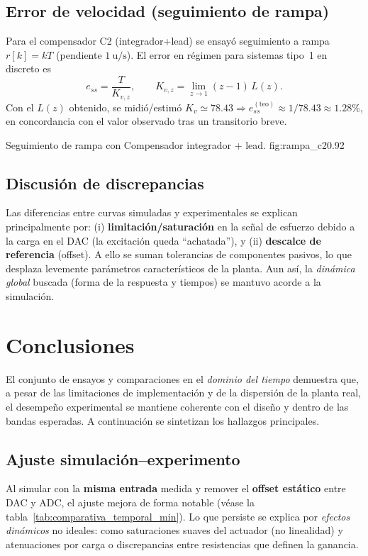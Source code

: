 \subsection{Error de velocidad (seguimiento de rampa)}
Para el compensador C2 (integrador+lead) se ensayó seguimiento a rampa \(r[k]=kT\) (pendiente \(1\ \mathrm{u}/\mathrm{s}\)). El error en régimen para sistemas tipo~1 en discreto es
\begin{equation}
	\label{eq:ess_rampa_discreto}
	e_{ss}=\frac{T}{K_{v,z}},\qquad K_{v,z}=\lim_{z\to1}(z-1)\,L(z).
\end{equation}
Con el \(L(z)\) obtenido, se midió/estimó \(K_v\simeq 78.43\Rightarrow e_{ss}^{(\mathrm{teo})}\approx 1/78.43\approx 1.28\%\), en concordancia con el valor observado tras un transitorio breve.

{Seguimiento de rampa con Compensador integrador + lead.}
{fig:rampa_c2}{0.92}

\subsection{Discusión de discrepancias}
Las diferencias entre curvas simuladas y experimentales se explican principalmente por: (i) \textbf{limitación/saturación} en la señal de esfuerzo debido a la carga en el DAC (la excitación queda “achatada”), y (ii) \textbf{descalce de referencia} (offset). A ello se suman tolerancias de componentes pasivos, lo que desplaza levemente parámetros característicos de la planta. Aun así, la \emph{dinámica global} buscada (forma de la respuesta y tiempos) se mantuvo acorde a la simulación.




\section{Conclusiones}

El conjunto de ensayos y comparaciones en el \emph{dominio del tiempo} demuestra que, a pesar de las limitaciones de implementación y de la dispersión de la planta real, el desempeño experimental se mantiene coherente con el diseño y dentro de las bandas esperadas. A continuación se sintetizan los hallazgos principales.

\subsection*{Ajuste simulación–experimento}
Al simular con la \textbf{misma entrada} medida y remover el \textbf{offset estático} entre DAC y ADC, el ajuste mejora de forma notable (véase la tabla~\ref{tab:comparativa_temporal_min}). Lo que persiste se explica por \emph{efectos dinámicos} no ideales: como saturaciones suaves del actuador (no linealidad) y  atenuaciones por carga o discrepancias entre resistencias que definen la ganancia.

